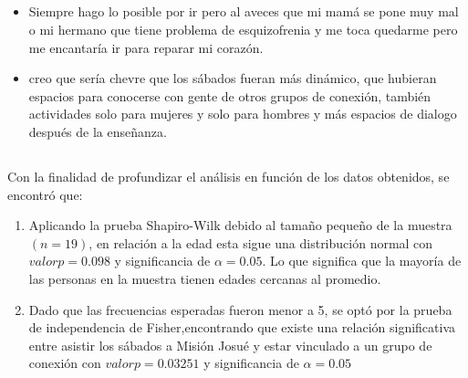 \documentclass{beamer}
\begin{document}
\subsection{}
\begin{frame}{}
\vspace{-0.9\baselineskip}
\begin{tcolorbox}[colback=backframe_color,colframe=beamer_color,title= Comentarios de los participantes] 
\begin{itemize}
   \item Siempre hago lo posible por ir pero  al aveces que mi mamá  se pone muy mal o mi hermano que tiene problema de esquizofrenia  y me toca quedarme   pero   me encantaría ir   para reparar mi  corazón. 

    \item creo que sería chevre que los sábados fueran más dinámico,  que hubieran espacios para conocerse con gente de otros grupos de conexión, también actividades solo para mujeres y solo para hombres y más espacios de dialogo después de la enseñanza. 
\end{itemize}
\end{tcolorbox}
\end{frame}




\subsection{}
\begin{frame}{}
\vspace{-0.9\baselineskip}
\begin{tcolorbox}[colback=backframe_color,colframe=beamer_color,title= Pruebas de hipótesis] 
Con la finalidad de profundizar el análisis en función de los datos obtenidos, se encontró que:

\begin{enumerate}
    \item Aplicando la prueba Shapiro-Wilk debido al tamaño pequeño de la muestra $(n=19)$, en relación a la edad esta sigue una distribución normal con $valor p = 0.098$ y significancia de $\alpha = 0.05$. Lo que significa que la mayoría de las personas en la muestra tienen edades cercanas al promedio. 
    \item Dado que las frecuencias esperadas fueron menor a 5, se optó por la prueba de independencia de Fisher,encontrando que existe una relación significativa entre asistir los sábados a Misión Josué y estar vinculado a un grupo de conexión con $valorp= 0.03251$ y significancia de $\alpha = 0.05$
\end{enumerate}
\end{tcolorbox}
\end{frame}
\end{document}
